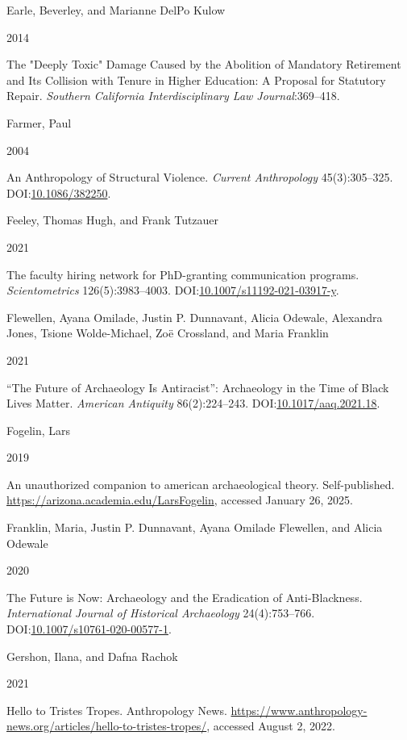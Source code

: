 \documentclass[
  12pt,
]{article}
\newlength{\cslhangindent}
\newlength{\csllabelwidth}
\newenvironment{CSLReferences}[2] %
 {\begin{list}{}{%
  \setlength{\itemindent}{0pt}
  \setlength{\leftmargin}{0pt}
  \setlength{\parsep}{0pt}
  \ifodd #1
   \setlength{\leftmargin}{\cslhangindent}
   \setlength{\itemindent}{-1\cslhangindent}
  \fi
  \setlength{\itemsep}{#2\baselineskip}}}
 {\end{list}}
\newcommand{\CSLBlock}[1]{\hfill\break\parbox[t]{\linewidth}{\strut\ignorespaces#1\strut}}
\newcommand{\CSLLeftMargin}[1]{\parbox[t]{\csllabelwidth}{\strut#1\strut}}
\newcommand{\CSLRightInline}[1]{\parbox[t]{\linewidth - \csllabelwidth}{\strut#1\strut}}
\begin{document}
\begin{CSLReferences}{0}{1}
\CSLBlock{Earle, Beverley, and Marianne DelPo Kulow}
\CSLLeftMargin{ 2014}%
\CSLRightInline{The {"}Deeply Toxic{"} Damage Caused by the Abolition of
Mandatory Retirement and Its Collision with Tenure in Higher Education:
A Proposal for Statutory Repair. \emph{Southern California
Interdisciplinary Law Journal}:369--418.}

\CSLBlock{Farmer, Paul}
\CSLLeftMargin{ 2004}%
\CSLRightInline{An Anthropology of Structural Violence. \emph{Current
Anthropology} 45(3):305--325.
DOI:\href{https://doi.org/10.1086/382250}{10.1086/382250}.}

\CSLBlock{Feeley, Thomas Hugh, and Frank Tutzauer}
\CSLLeftMargin{ 2021}%
\CSLRightInline{The faculty hiring network for PhD-granting
communication programs. \emph{Scientometrics} 126(5):3983--4003.
DOI:\href{https://doi.org/10.1007/s11192-021-03917-y}{10.1007/s11192-021-03917-y}.}

\CSLBlock{Flewellen, Ayana Omilade, Justin P. Dunnavant, Alicia Odewale,
Alexandra Jones, Tsione Wolde-Michael, Zoë Crossland, and Maria
Franklin}
\CSLLeftMargin{ 2021}%
\CSLRightInline{{``}The Future of Archaeology Is Antiracist{''}:
Archaeology in the Time of Black Lives Matter. \emph{American Antiquity}
86(2):224--243.
DOI:\href{https://doi.org/10.1017/aaq.2021.18}{10.1017/aaq.2021.18}.}

\CSLBlock{Fogelin, Lars}
\CSLLeftMargin{ 2019}%
\CSLRightInline{An unauthorized companion to american archaeological
theory. Self-published. \url{https://arizona.academia.edu/LarsFogelin},
accessed January 26, 2025.}

\CSLBlock{Franklin, Maria, Justin P. Dunnavant, Ayana Omilade Flewellen,
and Alicia Odewale}
\CSLLeftMargin{ 2020}%
\CSLRightInline{The Future is Now: Archaeology and the Eradication of
Anti-Blackness. \emph{International Journal of Historical Archaeology}
24(4):753--766.
DOI:\href{https://doi.org/10.1007/s10761-020-00577-1}{10.1007/s10761-020-00577-1}.}

\CSLBlock{Gershon, Ilana, and Dafna Rachok}
\CSLLeftMargin{ 2021}%
\CSLRightInline{Hello to {Tristes Tropes}. Anthropology News.
\url{https://www.anthropology-news.org/articles/hello-to-tristes-tropes/},
accessed August 2, 2022.}


\end{CSLReferences}
\end{document}
